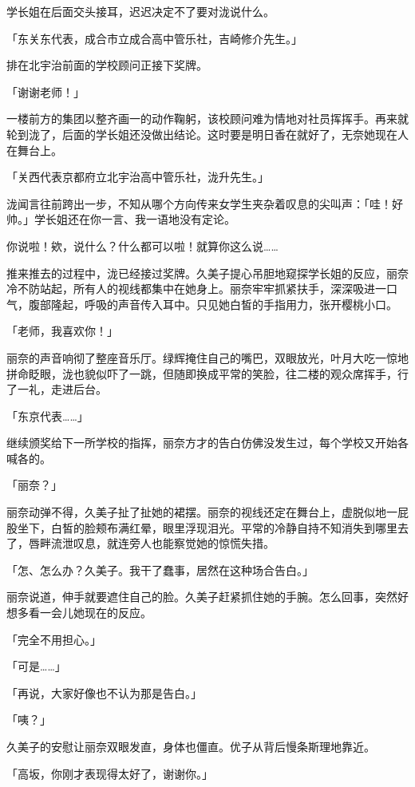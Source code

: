 \documentclass[UTF8]{ctexart}
\begin{document}
    学长姐在后面交头接耳，迟迟决定不了要对泷说什么。 

    「东关东代表，成合市立成合高中管乐社，吉崎修介先生。」 

    排在北宇治前面的学校顾问正接下奖牌。 

    「谢谢老师！」 

    一楼前方的集团以整齐画一的动作鞠躬，该校顾问难为情地对社员挥挥手。再来就轮到泷了，后面的学长姐还没做出结论。这时要是明日香在就好了，无奈她现在人在舞台上。 

    「关西代表京都府立北宇治高中管乐社，泷升先生。」 

    泷闻言往前跨出一步，不知从哪个方向传来女学生夹杂着叹息的尖叫声：「哇！好帅。」学长姐还在你一言、我一语地没有定论。 

    你说啦！欸，说什么？什么都可以啦！就算你这么说…… 

    推来推去的过程中，泷已经接过奖牌。久美子提心吊胆地窥探学长姐的反应，丽奈冷不防站起，所有人的视线都集中在她身上。丽奈牢牢抓紧扶手，深深吸进一口气，腹部隆起，呼吸的声音传入耳中。只见她白皙的手指用力，张开樱桃小口。 

    「老师，我喜欢你！」 

    丽奈的声音响彻了整座音乐厅。绿辉掩住自己的嘴巴，双眼放光，叶月大吃一惊地拼命眨眼，泷也貌似吓了一跳，但随即换成平常的笑脸，往二楼的观众席挥手，行了一礼，走进后台。 

    「东京代表……」 

    继续颁奖给下一所学校的指挥，丽奈方才的告白仿佛没发生过，每个学校又开始各喊各的。 

    「丽奈？」 

    丽奈动弹不得，久美子扯了扯她的裙摆。丽奈的视线还定在舞台上，虚脱似地一屁股坐下，白皙的脸颊布满红晕，眼里浮现泪光。平常的冷静自持不知消失到哪里去了，唇畔流泄叹息，就连旁人也能察觉她的惊慌失措。 

    「怎、怎么办？久美子。我干了蠢事，居然在这种场合告白。」 

    丽奈说道，伸手就要遮住自己的脸。久美子赶紧抓住她的手腕。怎么回事，突然好想多看一会儿她现在的反应。 

    「完全不用担心。」 

    「可是……」 

    「再说，大家好像也不认为那是告白。」 

    「咦？」 

    久美子的安慰让丽奈双眼发直，身体也僵直。优子从背后慢条斯理地靠近。 

    「高坂，你刚才表现得太好了，谢谢你。」 
\end{document}

